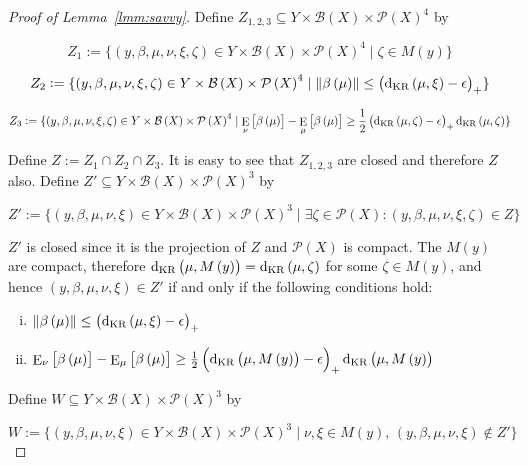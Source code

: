 \documentclass[aop,preprint]{imsart}
\numberwithin{equation}{section}
\theoremstyle{definition}
\theoremstyle{plain}
\newcommand{\N}[1]{\lVert #1 \rVert}
\DeclareMathOperator{\E}{E}
\newcommand{\PM}{\mathcal{P}}
\newcommand{\DKR}{\operatorname{d}_{\textnormal{KR}}}
\newcommand{\Gm}{\mathcal{B}}
\begin{document}
\begin{proof}[Proof of Lemma~\ref{lmm:savvy}]

Define $Z_{1,2,3} \subseteq Y \times \Gm\left(X\right) \times \PM\left(X\right)^4$ by

$$Z_1:=\{\left(y,\beta,\mu,\nu,\xi,\zeta\right) \in Y \times \Gm\left(X\right) \times \PM\left(X\right)^4 \mid \zeta \in M\left(y\right)\}$$

$$Z_2:=\{\left(y,\beta,\mu,\nu,\xi,\zeta\right) \in Y \times \Gm\left(X\right) \times \PM\left(X\right)^4 \mid \N{\beta\left(\mu\right)} \leq \left(\DKR\left(\mu,\xi\right) - \epsilon\right)_+\}$$

$$Z_3:=\{\left(y,\beta,\mu,\nu,\xi,\zeta\right) \in Y \times \Gm\left(X\right) \times \PM\left(X\right)^4 \mid \E_\nu\left[\beta\left(\mu\right)\right] - \E_\mu\left[\beta\left(\mu\right)\right] \geq \frac{1}{2}\left(\DKR\left(\mu,\zeta\right) - \epsilon\right)_+ \DKR\left(\mu,\zeta\right)\}$$

Define $Z := Z_1 \cap Z_2 \cap Z_3$. It is easy to see that $Z_{1,2,3}$ are closed and therefore $Z$ also. Define $Z' \subseteq Y \times \Gm\left(X\right) \times \PM\left(X\right)^3$ by

$$Z':=\{\left(y,\beta,\mu,\nu,\xi\right) \in Y \times \Gm\left(X\right) \times \PM\left(X\right)^3 \mid \exists \zeta \in \PM\left(X\right): \left(y,\beta,\mu,\nu,\xi,\zeta\right) \in Z\}$$

$Z'$ is closed since it is the projection of $Z$ and $\PM\left(X\right)$ is compact. The $M\left(y\right)$ are compact, therefore $\DKR\left(\mu,M\left(y\right)\right)=\DKR\left(\mu,\zeta\right)$ for some $\zeta \in M\left(y\right)$, and hence $\left(y,\beta,\mu,\nu,\xi\right) \in Z'$ if and only if the following conditions hold:

\begin{enumerate}[i.]

\item $\N{\beta\left(\mu\right)} \leq \left(\DKR\left(\mu,\xi\right) - \epsilon\right)_+$
\item $\E_\nu\left[\beta\left(\mu\right)\right] - \E_\mu\left[\beta\left(\mu\right)\right] \geq \frac{1}{2}\left(\DKR\left(\mu,M\left(y\right)\right) - \epsilon\right)_+ \DKR\left(\mu,M\left(y\right)\right)$

\end{enumerate}

Define $W \subseteq Y \times \Gm\left(X\right) \times \PM\left(X\right)^3$ by

$$W:=\{\left(y,\beta,\mu,\nu,\xi\right) \in Y \times \Gm\left(X\right) \times \PM\left(X\right)^3 \mid \nu,\xi \in M\left(y\right),\, \left(y,\beta,\mu,\nu,\xi\right) \not\in Z'\}$$


\end{proof}
\end{document}

